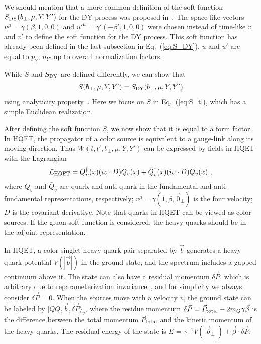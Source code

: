 We should mention that a more common definition of the soft function $S_{\rm DY}(b_\perp,\mu,Y,Y')$ for the DY process was proposed in~\cite{Collins:2011ca,Collins:2011zzd}. The space-like vectors $u^\mu=\gamma(\beta,1,0,0)$ and $u'^\mu=\gamma'(-\beta',1,0,0)$ were chosen instead of time-like $v $ and $v'$ to define the soft function for the DY process. This soft function has already been defined in the last subsection in Eq.~(\ref{eq:S_DY}). $u$ and $u'$ are equal to $p_Y$, $n_{Y'}$ up to overall normalization factors.

While $S$ and $S_{\rm DY}$ are defined differently, we can show that
\begin{align}\label{eq:S_t=S}
	S(b_\perp,\mu,Y,Y')=S_{\rm DY}(b_\perp,\mu,Y,Y')
\end{align}
using analyticity property~\cite{future}. Here we focus on $S$ in Eq.~(\ref{eq:S_t}), which has a simple Euclidean realization.

After defining the soft function $S$, we now show that it is equal to a form factor. In HQET, the propagator of a color source is equivalent to a gauge-link along its moving direction.
%
Thus $W(t,t',b_\perp,\mu,Y,Y')$ can be expressed by fields in HQET with the Lagrangian
\begin{align}
	{\cal L_{\rm HQET}}=Q_v^{\dagger}(x)(iv \cdot D)Q_v(x)+ \bar Q_v^{\dagger}(x)(iv \cdot D)\bar Q_v(x) \ ,
\end{align}
where $Q_v$ and $\bar Q_v$ are quark and anti-quark in the fundamental and anti-fundamental representations, respectively; $v^\mu=\gamma(1,\beta,\vec 0_\perp)$ is the four velocity; $D$ is the covariant derivative.
%
Note that quarks in HQET can be viewed as color sources.
%
If the gluon soft function is considered, the heavy quarks should be in the adjoint representation.


In HQET, a color-singlet heavy-quark pair separated by $\vec b$ generates a heavy quark potential $V(|\vec b|)$ in the ground state, and the spectrum includes a gapped continuum above it.
%
The state can also have a residual momentum $\delta\vec P$, which is arbitrary due to reparameterization invariance~\cite{Luke:1992cs,Manohar:2000dt}, and for simplicity we always consider $\delta\vec P=0$.
%
When the sources move with a velocity $v$, the ground state can be labeled by
$|\overline Q Q,\vec{b},\delta \vec P\rangle_v$, where the residue momentum $\delta\vec P=\vec{P}_{\rm total}-2m_Q\gamma\vec\beta$ is the difference between the total momentum $\vec{P}_{\rm total}$ and the kinetic momentum of the heavy-quarks.
%
The residual energy of the state is $E=\gamma^{-1}V(|\vec b_{\perp}|)+\vec{\beta}\cdot \delta\vec P$.

